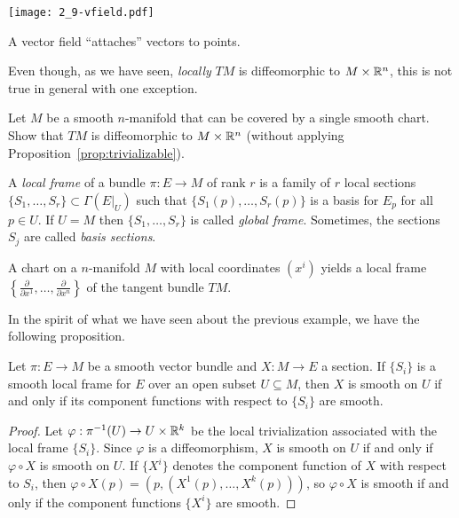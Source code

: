\begin{marginfigure}
	\texttt{[image: 2\_9-vfield.pdf]}
	\caption{A vector field ``attaches'' vectors to points.}%
	\label{fig:vectorfield-rn}
\end{marginfigure}

Even though, as we have seen, \emph{locally} $TM$ is diffeomorphic to $M\times\mathbb{R}^n$, this is not true in general with one exception.
\begin{exercise}\label{ex:trivializable}
	Let $M$ be a smooth $n$-manifold that can be covered by a single smooth chart.
	Show that $TM$ is diffeomorphic to $M\times\mathbb{R}^n$ (without applying Proposition~\ref{prop:trivializable}).
\end{exercise}

\begin{definition}
	A \emph{local frame} of a bundle $\pi:E\to M$ of rank $r$ is a family of $r$ local sections $\{S_1, \ldots, S_r\}\subset\Gamma(E|_U)$ such that $\{S_1(p), \ldots, S_r(p)\}$ is a basis for $E_p$ for all $p\in U$.
	If $U=M$ then $\{S_1, \ldots, S_r\}$ is called \emph{global frame}.
	Sometimes, the sections $S_j$ are called \emph{basis sections}.
\end{definition}

\begin{example}
	A chart on a $n$-manifold $M$ with local coordinates $(x^i)$ yields a local frame $\left\{\frac{\partial}{\partial x^1}, \ldots, \frac{\partial}{\partial x^n}\right\}$ of the tangent bundle $TM$.
\end{example}

In the spirit of what we have seen about the previous example, we have the following proposition.

\begin{proposition}
	Let $\pi:E \to M$ be a smooth vector bundle and $X:M\to E$ a section.
	If $\{S_i\}$ is a smooth local frame for $E$ over an open subset $U\subseteq M$, then $X$ is smooth on $U$ if and only if its component functions with respect to $\{S_i\}$ are smooth.
\end{proposition}
\begin{proof}
	Let $\varphi:\pi^{-1}(U) \to U\times\mathbb{R}^k$ be the local trivialization associated with the local frame $\{S_i\}$.
	Since $\varphi$ is a diffeomorphism, $X$ is smooth on $U$ if and only if $\varphi\circ X$ is smooth on $U$.
	If $\{X^i\}$ denotes the component function of $X$ with respect to $S_i$, then $\varphi\circ X (p) = (p, (X^1(p), \ldots, X^k(p)))$, so $\varphi\circ X$ is smooth if and only if the component functions $\{X^i\}$ are smooth.
\end{proof}

